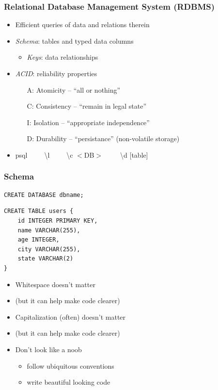 \documentclass[xcolor={dvipsnames}]{beamer}
\begin{document}
\frame
{
 \frametitle{Relational Database Management System (RDBMS)}

\Large 
\begin{itemize}
\item Efficient queries of data and relations therein 
\item<2-> \emph{Schema}: tables and typed data columns  
\begin{itemize}
\large 
\item \emph{Keys}: data relationships 
\end{itemize} 
\item<3-> \emph{ACID}: reliability properties

\begin{itemize}
\large
\item[A:] Atomicity -- ``all or nothing''
\item[C:] Consistency -- ``remain in legal state''
\item[I:] Isolation -- ``appropriate independence''
\item[D:] Durability -- ``persistance'' (non-volatile storage)
\end{itemize} 
\item[]
\item<4-> psql $\quad\;\;\;$ \textbackslash l $\quad\;\;\;$ \textbackslash c $<$DB$>$ $\quad\;\;\;$ \textbackslash d [table] 
\end{itemize}
}



\begin{frame}[fragile]\frametitle{Schema}

\color{gray}
\begin{verbatim}
CREATE DATABASE dbname;
\end{verbatim}
\vspace{-2em}
\color{black}

\begin{verbatim}
CREATE TABLE users {
    id INTEGER PRIMARY KEY,
    name VARCHAR(255),
    age INTEGER,
    city VARCHAR(255),
    state VARCHAR(2)
}
\end{verbatim}

\begin{itemize}
\item<2-> Whitespace doesn't matter 
\item<2->[] (but it can help make code clearer)
\item<3-> Capitalization (often) doesn't matter 
\item<3->[] (but it can help make code clearer)
\item<4-> Don't look like a noob
\begin{itemize}
\item follow ubiquitous conventions
\item write beautiful looking code
\end{itemize}
\end{itemize}

\end{frame}
\end{document}
